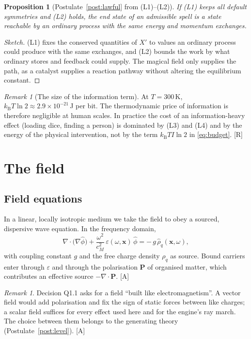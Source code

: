 \documentclass[11pt,a4paper]{article}
\numberwithin{equation}{section}
\theoremstyle{definition}
\theoremstyle{plain}
\newtheorem{proposition}[definition]{Proposition}
\theoremstyle{remark}
\newtheorem{remark}[definition]{Remark}
\newcommand{\kB}{k_{\mathrm B}}
\newcommand{\cM}{c_{M}}
\newcommand{\tagR}{\textcolor{tag}{\textsf{[R]}}}
\newcommand{\tagA}{\textcolor{tag}{\textsf{[A]}}}
\begin{document}
\begin{proposition}[Postulate~\ref{post:lawful} from (L1)--(L2)]
If (L1) keeps all default symmetries and (L2) holds, the end state of an admissible spell is a state reachable by an ordinary process with the same energy and momentum exchanges.
\end{proposition}
\begin{proof}[Sketch]
(L1) fixes the conserved quantities of $X'$ to values an ordinary process could produce with the same exchanges, and (L2) bounds the work by what ordinary stores and feedback could supply. The magical field only supplies the path, as a catalyst supplies a reaction pathway without altering the equilibrium constant.
\end{proof}

\begin{remark}[The size of the information term]\label{rem:landauer}
At $T=300$\,K, $\kB T\ln 2\approx 2.9\times10^{-21}$\,J per bit. The thermodynamic price of information is therefore negligible at human scales. In practice the cost of an information-heavy effect (loading dice, finding a person) is dominated by (L3) and (L4) and by the energy of the physical intervention, not by the term $\kB T I\ln 2$ in \eqref{eq:budget}. \tagR
\end{remark}

\section{The field}\label{sec:field}

\subsection{Field equations}
In a linear, locally isotropic medium we take the field to obey a sourced, dispersive wave equation. In the frequency domain,
\begin{equation}\label{eq:helmholtz}
\nabla\cdot\big(\nabla\hat\phi\big) + \frac{\omega^2}{\cM^2}\,\varepsilon(\omega,\bm x)\,\hat\phi = -\,g\,\hat\rho_q(\bm x,\omega),
\end{equation}
with coupling constant $g$ and the free charge density $\rho_q$ as source. Bound carriers enter through $\varepsilon$ and through the polarisation $\bm P$ of organised matter, which contributes an effective source $-\nabla\cdot\bm P$. \tagA

\begin{remark}
Decision Q1.1 asks for a field ``built like electromagnetism''. A vector field would add polarisation and fix the sign of static forces between like charges; a scalar field suffices for every effect used here and for the engine's ray march. The choice between them belongs to the generating theory (Postulate~\ref{post:level}). \tagA
\end{remark}
\end{document}
